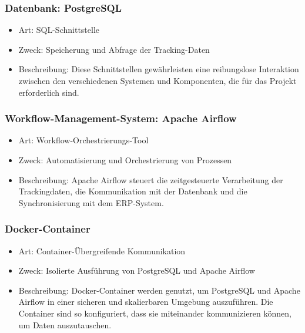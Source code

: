 \subsubsection{Datenbank: PostgreSQL}
\begin{itemize}
\item Art: SQL-Schnittstelle
\item Zweck: Speicherung und Abfrage der Tracking-Daten
\item Beschreibung: Diese Schnittstellen gewährleisten eine reibungslose Interaktion zwischen den verschiedenen Systemen und Komponenten, die für das Projekt erforderlich sind.
\end{itemize}

\subsubsection{Workflow-Management-System: Apache Airflow}
\begin{itemize}
\item Art: Workflow-Orchestrierungs-Tool
\item Zweck: Automatisierung und Orchestrierung von Prozessen
\item Beschreibung: Apache Airflow steuert die zeitgesteuerte Verarbeitung der Trackingdaten, die Kommunikation mit der Datenbank und die Synchronisierung mit dem ERP-System.
\end{itemize}

\subsubsection{Docker-Container}
\begin{itemize}
\item Art: Container-Übergreifende Kommunikation
\item Zweck: Isolierte Ausführung von PostgreSQL und Apache Airflow
\item Beschreibung: Docker-Container werden genutzt, um PostgreSQL und Apache Airflow in einer sicheren und skalierbaren Umgebung auszuführen. Die Container sind so konfiguriert, dass sie miteinander kommunizieren können, um Daten auszutauschen. 
\end{itemize}
